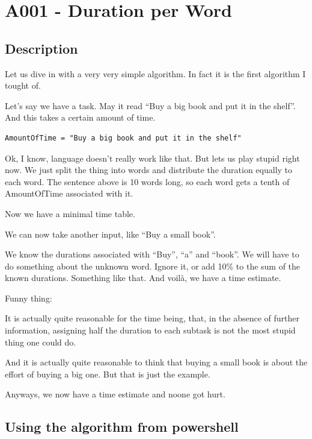 \newpage{}

\hypertarget{a001---duration-per-word}{%
\section{A001 - Duration per Word}\label{a001---duration-per-word}}

\hypertarget{description}{%
\subsection{Description}}

Let us dive in with a very very simple algorithm. In fact it is the
first algorithm I tought of.

Let's say we have a task. May it read ``Buy a big book and put it in the
shelf''. And this takes a certain amount of time.

\begin{verbatim}
AmountOfTime = "Buy a big book and put it in the shelf"
\end{verbatim}

Ok, I know, language doesn't really work like that. But lets us play
stupid right now. We just split the thing into words and distribute the
duration equally to each word. The sentence above is 10 words long, so
each word gets a tenth of AmountOfTime associated with it.

Now we have a minimal time table.

We can now take another input, like ``Buy a small book''.

We know the durations associated with ``Buy'', ``a'' and ``book''. We
will have to do something about the unknown word. Ignore it, or add 10\%
to the sum of the known durations. Something like that. And voilà, we
have a time estimate.

Funny thing:

It is actually quite reasonable for the time being, that, in the absence
of further information, assigning half the duration to each subtask is
not the most stupid thing one could do.

And it is actually quite reasonable to think that buying a small book is
about the effort of buying a big one. But that is just the example.

Anyways, we now have a time estimate and noone got hurt.

\hypertarget{using-the-algorithm-from-powershell}{%
\subsection{Using the algorithm from powershell}}

